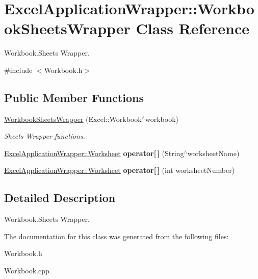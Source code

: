 \hypertarget{class_excel_application_wrapper_1_1_workbook_sheets_wrapper}{}\section{Excel\+Application\+Wrapper\+:\+:Workbook\+Sheets\+Wrapper Class Reference}
\label{class_excel_application_wrapper_1_1_workbook_sheets_wrapper}


Workbook.\+Sheets Wrapper.  




{\ttfamily \#include $<$Workbook.\+h$>$}

\subsection*{Public Member Functions}
\begin{DoxyCompactItemize}
\item 
\hypertarget{class_excel_application_wrapper_1_1_workbook_sheets_wrapper_abf61e90a0b8f63a90a46958feb6dc48b}{}\hyperlink{class_excel_application_wrapper_1_1_workbook_sheets_wrapper_abf61e90a0b8f63a90a46958feb6dc48b}{Workbook\+Sheets\+Wrapper} (Excel\+::\+Workbook$^\wedge$workbook)\label{class_excel_application_wrapper_1_1_workbook_sheets_wrapper_abf61e90a0b8f63a90a46958feb6dc48b}

\begin{DoxyCompactList}\small\item\em Sheets Wrapper functions. \end{DoxyCompactList}\item 
\hypertarget{class_excel_application_wrapper_1_1_workbook_sheets_wrapper_a0d86fd44eb3a0fe16e903c294d90377c}{}\hyperlink{class_excel_application_wrapper_1_1_worksheet}{Excel\+Application\+Wrapper\+::\+Worksheet} {\bfseries operator\mbox{[}$\,$\mbox{]}} (String$^\wedge$worksheet\+Name)\label{class_excel_application_wrapper_1_1_workbook_sheets_wrapper_a0d86fd44eb3a0fe16e903c294d90377c}

\item 
\hypertarget{class_excel_application_wrapper_1_1_workbook_sheets_wrapper_ae9389993f97bb44dc38f960161d84af7}{}\hyperlink{class_excel_application_wrapper_1_1_worksheet}{Excel\+Application\+Wrapper\+::\+Worksheet} {\bfseries operator\mbox{[}$\,$\mbox{]}} (int worksheet\+Number)\label{class_excel_application_wrapper_1_1_workbook_sheets_wrapper_ae9389993f97bb44dc38f960161d84af7}

\end{DoxyCompactItemize}


\subsection{Detailed Description}
Workbook.\+Sheets Wrapper. 

The documentation for this class was generated from the following files\+:\begin{DoxyCompactItemize}
\item 
Workbook.\+h\item 
Workbook.\+cpp\end{DoxyCompactItemize}
